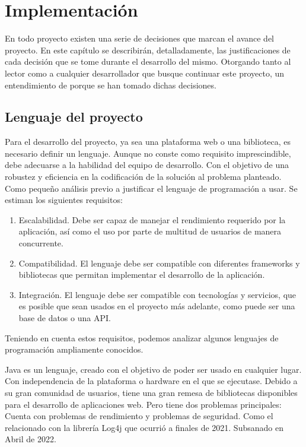 \chapter{Implementación}
En todo proyecto existen una serie de decisiones que marcan el avance del proyecto. En este capítulo se describirán, detalladamente, las justificaciones de cada decisión que se tome durante el desarrollo del mismo. Otorgando tanto al lector como a cualquier desarrollador que busque continuar este proyecto, un entendimiento de porque se han tomado dichas decisiones.

\section{Lenguaje del proyecto}
Para el desarrollo del proyecto, ya sea una plataforma web o una biblioteca, es necesario definir un lenguaje. Aunque no conste como requisito imprescindible, debe adecuarse a la habilidad del equipo de desarrollo. Con el objetivo de una robustez y eficiencia en la codificación de la solución al problema planteado. Como pequeño análisis previo a justificar el lenguaje de programación a usar. Se estiman los siguientes requisitos: 
\begin{enumerate}
    \item Escalabilidad. Debe ser capaz de manejar el rendimiento requerido por la aplicación, así como el uso por parte de multitud de usuarios de manera concurrente.
    \item Compatibilidad. El lenguaje debe ser compatible con diferentes frameworks y bibliotecas que permitan implementar el desarrollo de la aplicación. 
    \item Integración. El lenguaje debe ser compatible con tecnologías y servicios, que es posible que sean usados en el proyecto más adelante, como puede ser una base de datos o una API.
\end{enumerate}

Teniendo en cuenta estos requisitos, podemos analizar algunos lenguajes de programación ampliamente conocidos. 

Java es un lenguaje, creado con el objetivo de poder ser usado en cualquier lugar. Con independencia de la plataforma o hardware en el que se ejecutase. Debido a su gran comunidad de usuarios, tiene una gran remesa de bibliotecas disponibles para el desarrollo de aplicaciones web. Pero tiene dos problemas principales: Cuenta con problemas de rendimiento y problemas de seguridad. Como el relacionado con la librería Log4j que ocurrió a finales de 2021. Subsanado en Abril de 2022.\cite{cisa}


